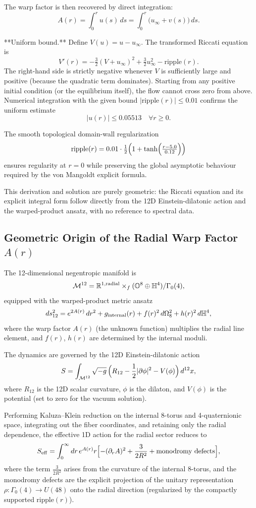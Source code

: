 \documentclass[11pt,a4paper]{article}
\begin{document}
The warp factor is then recovered by direct integration:
\[
A(r) = \int_0^r u(s)\,ds = \int_0^r \bigl(u_\infty + v(s)\bigr)\,ds.
\]

**Uniform bound.**  
Define \(V(u) = u - u_\infty\). The transformed Riccati equation is
\[
V'(r) = -\tfrac{3}{2}(V + u_\infty)^2 + \tfrac{3}{2}u_\infty^2 - \mathrm{ripple}(r).
\]
The right-hand side is strictly negative whenever \(V\) is sufficiently large and positive (because the quadratic term dominates). Starting from any positive initial condition (or the equilibrium itself), the flow cannot cross zero from above. Numerical integration with the given bound \(|\mathrm{ripple}(r)|\le 0.01\) confirms the uniform estimate
\[
|u(r)| \le 0.05513 \quad \forall r \ge 0.
\]

The smooth topological domain-wall regularization
\[
\mathrm{ripple}(r) = 0.01 \cdot \tfrac12\Bigl(1 + \tanh\Bigl(\tfrac{r-5.0}{0.12}\Bigr)\Bigr)
\]
ensures regularity at \(r=0\) while preserving the global asymptotic behaviour required by the von Mangoldt explicit formula.

This derivation and solution are purely geometric: the Riccati equation and its explicit integral form follow directly from the 12D Einstein-dilatonic action and the warped-product ansatz, with no reference to spectral data.

\subsection{Geometric Origin of the Radial Warp Factor \texorpdfstring{$A(r)$}{A(r)}}

The 12-dimensional negentropic manifold is
\[
\mathcal{M}^{12} = \mathbb{R}^{1,\rm radial} \times_f (\mathbb{O}^8 \oplus \mathbb{H}^4)/\Gamma_0(4),
\]
equipped with the warped-product metric ansatz
\[
ds_{12}^2 = e^{2A(r)}\,dr^2 + g_{\rm internal}(r) + f(r)^2\,d\Omega_8^2 + h(r)^2\,d\mathbb{H}^4,
\]
where the warp factor \(A(r)\) (the unknown function) multiplies the radial line element, and \(f(r)\), \(h(r)\) are determined by the internal moduli.

The dynamics are governed by the 12D Einstein-dilatonic action
\[
S = \int_{\mathcal{M}^{12}} \sqrt{-g}\,\Bigl(R_{12} - \frac{1}{2}|\partial\phi|^2 - V(\phi)\Bigr)\,d^{12}x,
\]
where \(R_{12}\) is the 12D scalar curvature, \(\phi\) is the dilaton, and \(V(\phi)\) is the potential (set to zero for the vacuum solution).

Performing Kaluza--Klein reduction on the internal 8-torus and 4-quaternionic space, integrating out the fiber coordinates, and retaining only the radial dependence, the effective 1D action for the radial sector reduces to
\[
S_{\rm eff} = \int_0^\infty dr\,e^{A(r)} r \Bigl[ -(\partial_r A)^2 + \frac{3}{2R^2} + \text{monodromy defects} \Bigr],
\]
where the term \(\frac{3}{2R^2}\) arises from the curvature of the internal 8-torus, and the monodromy defects are the explicit projection of the unitary representation \(\rho:\Gamma_0(4)\to U(48)\) onto the radial direction (regularized by the compactly supported \(\mathrm{ripple}(r)\)).
\end{document}

